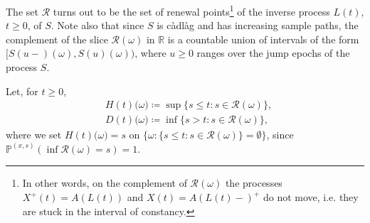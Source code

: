 \documentclass[reqno]{amsart}
\theoremstyle{remark}
\numberwithin{equation}{section} %
\newcommand{\RR}{\mathbb{R}}
\newcommand{\1}{\mathds{1}}
\begin{document}
	The set $\mathcal{R}$ turns out to be the set of renewal points\footnote{In other words, on the complement of $\mathcal{R}(\omega)$ the processes $X^+(t)=A(L(t))$ and $X(t)=A(L(t)-)^+$ do not move, i.e. they are stuck in the interval of constancy.} of the inverse process $L(t)$, $t\ge0$, of $S$. Note also that since $S$ is càdlàg and has increasing sample paths,  the complement of the slice $\mathcal{R}(\omega)$ in $\RR$ is a countable union of intervals of the form
	$\big[S(u-)(\omega), S(u) (\omega)\big)$, where $u \ge 0$ ranges over the jump epochs of the process $S$.
	
	Let, for $t \geq 0$,
	\begin{align}
		&H(t)\big(\omega\big) \coloneqq \sup \{ s \leq t : s \in \mathcal{R}(\omega) \}, \label{def_under}\\
		& D(t)\big(\omega\big) \coloneqq \inf \{ s >t : s \in \mathcal{R}(\omega) \}\label{def_over},
	\end{align}
	where we set $H(t)\big(\omega\big) = s$ on $\{ \omega : \{ s \leq t : s \in \mathcal{R}(\omega) \} = \emptyset \}$, since $\mathds{P}^{(x,s)} (\inf \mathcal{R}(\omega) = s)=1$. 
	
\end{document}
